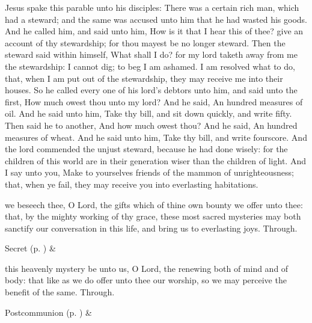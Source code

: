  Jesus spake this parable unto his disciples: There was a certain rich man, which had a steward; and the same was accused unto him that he had wasted his goods. And he called him, and said unto him, How is it that I hear this of thee? give an account of thy stewardship; for thou mayest be no longer steward. Then the steward said within himself, What shall I do? for my lord taketh away from me the stewardship: I cannot dig; to beg I am ashamed. I am resolved what to do, that, when I am put out of the stewardship, they may receive me into their houses. So he called every one of his lord's debtors unto him, and said unto the first, How much owest thou unto my lord? And he said, An hundred measures of oil. And he said unto him, Take thy bill, and sit down quickly, and write fifty. Then said he to another, And how much owest thou? And he said, An hundred measures of wheat. And he said unto him, Take thy bill, and write fourscore. And the lord commended the unjust steward, because he had done wisely: for the children of this world are in their generation wiser than the children of light. And I say unto you, Make to yourselves friends of the mammon of unrighteousness; that, when ye fail, they may receive you into everlasting habitations.


\secret
{} we beseech thee, O Lord, the gifts which of thine own bounty we offer unto thee: that, by the mighty working of thy grace, these most sacred mysteries may both sanctify our conversation in this life, and bring us to everlasting joys. Through.
\begin{rubric}
     Secret  (p. \pageref{SPSaints}) \&  
\end{rubric}


\postcommunion
{} this heavenly mystery be unto us, O Lord, the renewing both of mind and of body: that like as we do offer unto thee our worship, so we may perceive the benefit of the same. Through.
\begin{rubric}
     Postcommunion  (p. \pageref{SPSaints}) \&  
\end{rubric}


